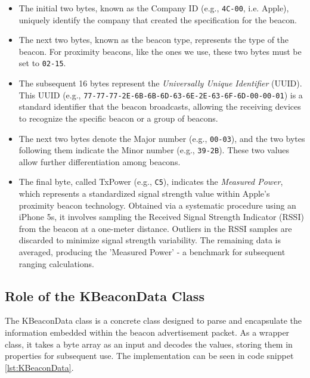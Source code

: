\begin{itemize}
  \item The initial two bytes, known as the Company ID (e.g., \texttt{4C-00}, i.e. Apple), uniquely identify the company that created the specification for the beacon.
  \item The next two bytes, known as the beacon type, represents the type of the beacon. For proximity beacons, like the ones we use, these two bytes must be set to \texttt{02-15}.
  \item The subsequent 16 bytes represent the \textit{Universally Unique Identifier} (UUID).
This UUID (e.g., \texttt{77-77-77-2E-6B-6B-6D-63-6E-2E-63-6F-6D-00-00-01}) is a standard identifier that the beacon broadcasts, allowing the receiving devices to recognize the specific beacon or a group of beacons.
  \item The next two bytes denote the Major number (e.g., \texttt{00-03}), and the two bytes following them indicate the Minor number (e.g., \texttt{39-2B}).
These two values allow further differentiation among beacons.
  \item The final byte, called TxPower (e.g., \texttt{C5}), indicates the \textit{Measured Power}, which represents a standardized signal strength value within Apple's proximity beacon technology. Obtained via a systematic procedure using an iPhone 5s, it involves sampling the Received Signal Strength Indicator (RSSI) from the beacon at a one-meter distance. Outliers in the RSSI samples are discarded to minimize signal strength variability. The remaining data is averaged, producing the 'Measured Power' - a benchmark for subsequent ranging calculations.
\end{itemize}
\cite{apple2023ibeacon}

\subsection{Role of the KBeaconData Class}

The KBeaconData class is a concrete class designed to parse and encapsulate the information embedded within the beacon advertisement packet.
As a wrapper class, it takes a byte array as an input and decodes the values, storing them in properties for subsequent use.
The implementation can be seen in code snippet \ref{lst:KBeaconData}.



